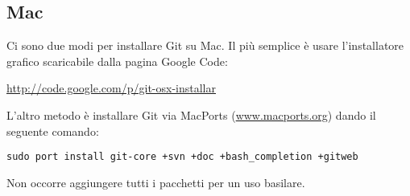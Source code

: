 \subsection{Mac}
Ci sono due modi per installare Git su Mac. Il più semplice è usare l'installatore grafico scaricabile dalla pagina Google Code:

\url{http://code.google.com/p/git-osx-installar}

L'altro metodo è installare Git via MacPorts (\url{www.macports.org}) dando il seguente comando:

\begin{center}
\texttt{sudo port install git-core +svn +doc +bash_completion +gitweb}
\end{center}

Non occorre aggiungere tutti i pacchetti per un uso basilare.